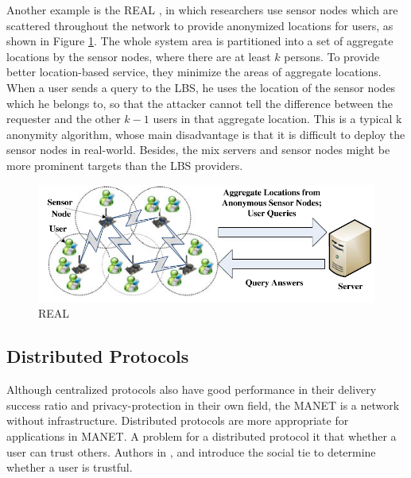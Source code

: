 Another example is the REAL \cite{C26}, in which researchers use sensor nodes which are scattered throughout the network to provide anonymized locations for users, as shown in Figure \ref{fig:REAL}. The whole system area is partitioned into a set of aggregate locations by the sensor nodes, where there are at least $k$ persons. To provide better location-based service, they minimize the areas of aggregate locations. When a user sends a query to the LBS, he uses the location of the sensor nodes which he belongs to, so that the attacker cannot tell the difference between the requester and the other $k-1$ users in that aggregate location. This is a typical k anonymity algorithm, whose main disadvantage is that it is difficult to deploy the sensor nodes in real-world. Besides, the mix servers and sensor nodes might be more prominent targets than the LBS providers.

\begin{figure} [H]
  \centering 
  \includegraphics[width=5.0in]{figures/FIG_REAL_26.png}
  \caption{REAL \cite{C26}} 
  \label{fig:REAL} %
\end{figure}

\subsection{ Distributed Protocols}

\noindent Although centralized protocols also have good performance in their delivery success ratio and privacy-protection in their own field, the MANET is a network without infrastructure. Distributed protocols are more appropriate for applications in MANET. A problem for a distributed protocol it that whether a user can trust others. Authors in \cite{C16}, \cite{C17} and \cite{C18} introduce the social tie to determine whether a user is trustful.

